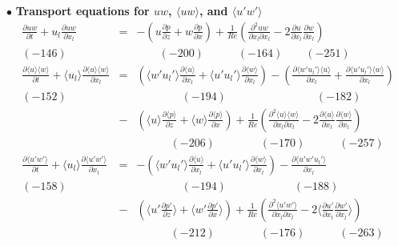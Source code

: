 \documentclass[a4paper,11pt]{article}
\begin{document}
\noindent $\bullet$  \textbf{Transport equations for $uw$, $\langle uw\rangle$, and $\langle u'w'\rangle$}
\begin{eqnarray}
\frac{\partial uw }{\partial t}
+u_l\frac{\partial uw }{\partial x_l}
&=&-(u\frac{\partial p }{\partial z}+w\frac{\partial p }{\partial x})
+\frac{1}{Re}(\frac{\partial^2 uw }{\partial x_l\partial x_l}-2\frac{\partial u }{\partial x_l}\frac{\partial w }{\partial x_l}) \\
(-146) &&\quad{}  \quad{}(-200) \quad{}  \qquad{} (-164) \quad{} \quad{} (-251)\nonumber \\
\frac{\partial \langle u\rangle \langle w\rangle }{\partial t}
+\langle u_l\rangle \frac{\partial \langle u\rangle \langle w\rangle }{\partial x_l}
&=&(\langle w'u_l'\rangle \frac{\partial \langle u \rangle}{\partial x_l}+\langle u'u_l'\rangle \frac{\partial \langle w \rangle  }{\partial x_l})
-(\frac{\partial \langle w'u_l'\rangle \langle u \rangle }{\partial x_l}+\frac{\partial \langle u'u_l'\rangle \langle w \rangle }{\partial x_l}) \nonumber \\
(-152) \quad{}&&\qquad{} \qquad{}(-194) \qquad{}\qquad{}  \qquad{} \qquad{} (-182)\nonumber \\
&-&(\langle u\rangle \frac{\partial \langle p\rangle }{\partial z}+\langle w \rangle \frac{\partial \langle p\rangle }{\partial x})
+\frac{1}{Re}(\frac{\partial^2 \langle u\rangle \langle w \rangle}{\partial x_l\partial x_l}-2\frac{\partial \langle u\rangle }{\partial x_l} \frac{\partial \langle w\rangle }{\partial x_l}) \\
&&\qquad{}\quad{} (-206) \qquad{} \qquad{}  (-170)\quad{} \qquad{} (-257)\nonumber \\
\frac{\partial \langle u'w'\rangle }{\partial t}
+\langle u_l\rangle \frac{\partial \langle u'w'\rangle }{\partial x_l}
&=&-(\langle w'u_l'\rangle \frac{\partial \langle u \rangle  }{\partial x_l}+\langle u'u_l'\rangle \frac{\partial \langle w \rangle  }{\partial x_l})
-\frac{\partial \langle u'w'u_l'\rangle}{\partial x_l} \nonumber \\
(-158) \quad{}&&\qquad{} \qquad{}(-194)  \qquad{}\qquad{} \qquad{} (-188)\nonumber \\
&-&(\langle u' \frac{\partial  p' }{\partial z}\rangle +\langle w' \frac{\partial p' }{\partial x}\rangle)
+\frac{1}{Re}(\frac{\partial^2 \langle u'w' \rangle}{\partial x_l\partial x_l}-2\langle \frac{\partial  u' }{\partial x_l}\frac{\partial  w' }{\partial x_l}\rangle)  \\
&&\qquad{}\quad{} (-212) \qquad{} \qquad{}  (-176)\quad{} \qquad{} (-263)\nonumber 
\end{eqnarray}
\end{document}
